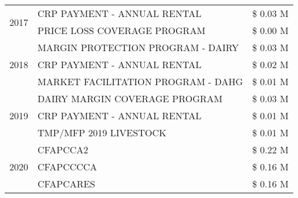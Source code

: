 \begin{tabular}{llr}
\cline{1-3}
\multirow[t]{2}{*}{2017} & CRP PAYMENT - ANNUAL RENTAL & \$ 0.03 M \\
 & PRICE LOSS COVERAGE PROGRAM & \$ 0.00 M \\
\cline{1-3}
\multirow[t]{3}{*}{2018} & MARGIN PROTECTION PROGRAM - DAIRY & \$ 0.03 M \\
 & CRP PAYMENT - ANNUAL RENTAL & \$ 0.02 M \\
 & MARKET FACILITATION PROGRAM - DAHG & \$ 0.01 M \\
\cline{1-3}
\multirow[t]{3}{*}{2019} & DAIRY MARGIN COVERAGE PROGRAM & \$ 0.03 M \\
 & CRP PAYMENT - ANNUAL RENTAL & \$ 0.01 M \\
 & TMP/MFP 2019 LIVESTOCK & \$ 0.01 M \\
\cline{1-3}
\multirow[t]{3}{*}{2020} & CFAPCCA2 & \$ 0.22 M \\
 & CFAPCCCCA & \$ 0.16 M \\
 & CFAPCARES & \$ 0.16 M \\
\cline{1-3}
\bottomrule
\end{tabular}

